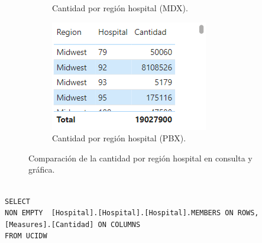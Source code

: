 \documentclass{article}
\begin{document}
\begin{figure}[H]
\begin{subfigure}[b]{0.2\textwidth}
		\caption{Cantidad por región hospital (MDX).}
		\label{fig:region_hospital_mdx}
	\end{subfigure}
	\hfill
	\begin{subfigure}[b]{0.4\textwidth}
		\centering
		\includegraphics[width=\textwidth]{images/cantidad_region_hospital_tabla_pbx.png}
		\caption{Cantidad por región hospital (PBX).}
		\label{fig:region_hospital_pbx}
	\end{subfigure}
	\caption{Comparación de la cantidad por región hospital en consulta y gráfica.}
	\label{fig:region_hospital_comparacion}
\end{figure}

\begin{lstlisting}[style=ddlstyle, label=lst:consulta5, caption=Cantidad por Región y Hospital]

SELECT 
NON EMPTY  [Hospital].[Hospital].[Hospital].MEMBERS ON ROWS, 
[Measures].[Cantidad] ON COLUMNS
FROM UCIDW
\end{lstlisting}
\end{document}

